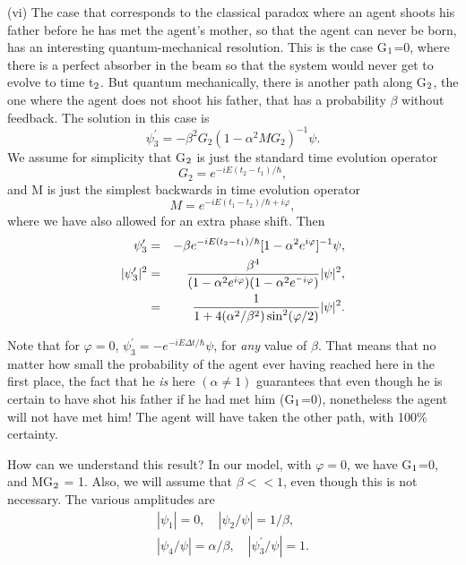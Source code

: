 \noindent
(vi) The case that corresponds to the classical paradox where an agent shoots his
father before he has met the agent's mother, so that the agent can never be born, has an
interesting quantum-mechanical resolution. This is the case G$_{{\rm 1}}$=0,
where there is a perfect absorber in the beam so that the system would never
get to evolve to time t$_{{\rm 2}}$. But quantum mechanically, there is
another path along G$_{{\rm 2}}$, the one where the agent does not shoot his
father, that has a probability $\beta $ without feedback. The solution in
this case is
\begin{equation}
\label{eq32}
\psi _{3} ^{\prime}  = - \beta ^{2}G_{2} (1 - \alpha ^{2}MG_{2} )^{ - 1}\psi
.
\end{equation}
We assume for simplicity that G$_{{\rm 2}}$ is just the standard time
evolution operator
\begin{equation}
\label{eq33}
G_{2} = e^{ - iE(t_{2} - t_{1} ) / \hbar} ,
\end{equation}
and M is just the simplest backwards in time evolution operator
\begin{equation}
\label{eq34}
M = e^{ - iE(t_{1} - t_{2} ) / \hbar + i\varphi} ,
\end{equation}
where we have also allowed for an extra phase shift. Then
\begin{eqnarray}
\psi_3'&=&-\beta e^{ - iE(t_{2} - t_{1} ) / \hbar }  [1-\alpha^2e^{i\varphi}]^{-1}\psi ,
\nonumber \\
\vert \psi_3'  \vert^2&=&{\beta^4\over (1-\alpha^2 e^{i\varphi})(1-\alpha^2  e^{^-i\varphi})}
\vert \psi \vert^2 ,
\nonumber \\
&=&
{1\over 1+4(\alpha^2/\beta^2)\sin^2 (\varphi /2)}
\vert \psi \vert^2    .
\label{eq35}
\end{eqnarray}



Note that for $\varphi = 0$, $\psi _{3} ^{\prime}  = - e^{ - iE\Delta t /
\hbar} \psi $, for \textit{any} value of $\beta $. That means that no matter how small
the probability of the agent ever having reached here in the first place, the
fact that he \textit{is} here $(\alpha \ne 1)$ guarantees that even though he is
certain to have shot his father if he had met him (G$_{{\rm 1}}$=0),
nonetheless the agent will not have met him! The agent will have taken the other path,
with 100\% certainty.

How can we understand this result? In our model, with $\varphi = 0$, we have
G$_{{\rm 1}}$=0, and MG$_{{\rm 2}}$ = 1. Also, we will assume that $\beta <
< 1$, even though this is not necessary. The various amplitudes are
\begin{equation}
\label{eq36}
\begin{array}{l}
 {\left| {\psi _{1}}  \right|} = 0,\quad {\left| {\psi _{2} / \psi}
\right|} = 1 / \beta , \\
 {\left| {\psi _{4} / \psi}  \right|} = \alpha / \beta ,\quad {\left| {\psi
_{3} ^{\prime}  / \psi}  \right|} = 1. \\
 \end{array}
\end{equation}



